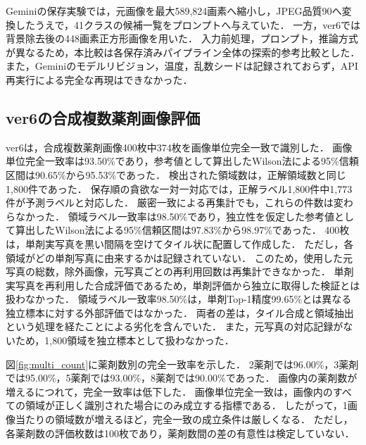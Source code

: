 \documentclass[uplatex,dvipdfmx]{jsarticle}
\begin{document}
Geminiの保存実験では，元画像を最大589,824画素へ縮小し，JPEG品質90へ変換したうえで，41クラスの候補一覧をプロンプトへ与えていた．
一方，ver6では背景除去後の448画素正方形画像を用いた．
入力前処理，プロンプト，推論方式が異なるため，本比較は各保存済みパイプライン全体の探索的参考比較とした．
また，Geminiのモデルリビジョン，温度，乱数シードは記録されておらず，API再実行による完全な再現はできなかった．

\subsection{ver6の合成複数薬剤画像評価}\label{sec:ver6_multi}

ver6は，合成複数薬剤画像400枚中374枚を画像単位完全一致で識別した．
画像単位完全一致率は93.50\%であり，参考値として算出したWilson法による95\%信頼区間は90.65\%から95.53\%であった．
検出された領域数は，正解領域数と同じ1,800件であった．
保存順の貪欲な一対一対応では，正解ラベル1,800件中1,773件が予測ラベルと対応した．
厳密一致による再集計でも，これらの件数は変わらなかった．
領域ラベル一致率は98.50\%であり，独立性を仮定した参考値として算出したWilson法による95\%信頼区間は97.83\%から98.97\%であった．
400枚は，単剤実写真を黒い間隔を空けてタイル状に配置して作成した．
ただし，各領域がどの単剤写真に由来するかは記録されていない．
このため，使用した元写真の総数，除外画像，元写真ごとの再利用回数は再集計できなかった．
単剤実写真を再利用した合成評価であるため，単剤評価から独立に取得した検証とは扱わなかった．
領域ラベル一致率98.50\%は，単剤Top-1精度99.65\%とは異なる独立標本に対する外部評価ではなかった．
両者の差は，タイル合成と領域抽出という処理を経たことによる劣化を含んでいた．
また，元写真の対応記録がないため，1,800領域を独立標本として扱わなかった．

図\ref{fig:multi_count}に薬剤数別の完全一致率を示した．
2薬剤では96.00\%，3薬剤では95.00\%，5薬剤では93.00\%，8薬剤では90.00\%であった．
画像内の薬剤数が増えるにつれて，完全一致率は低下した．
画像単位完全一致は，画像内のすべての領域が正しく識別された場合にのみ成立する指標である．
したがって，1画像当たりの領域数が増えるほど，完全一致の成立条件は厳しくなる．
ただし，各薬剤数の評価枚数は100枚であり，薬剤数間の差の有意性は検定していない．
\end{document}
